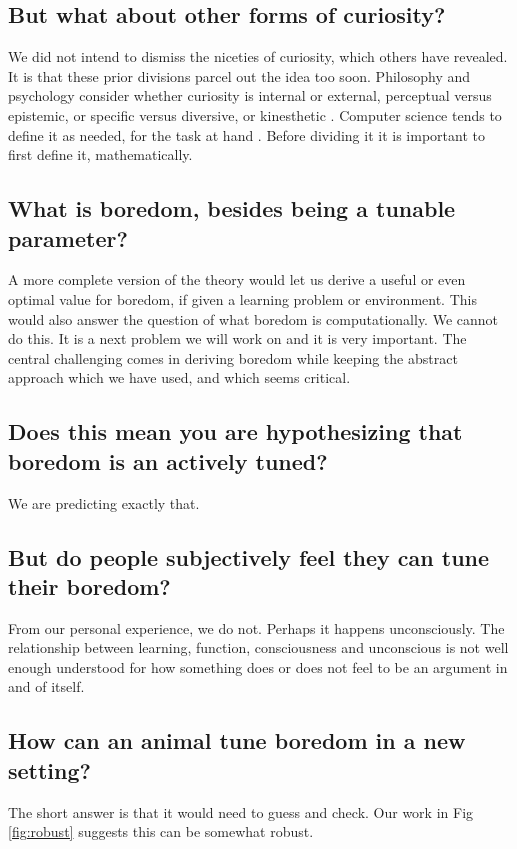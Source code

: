 \subsection*{But what about other forms of curiosity?}
We did not intend to dismiss the niceties of curiosity, which others have revealed. It is that these prior divisions parcel out the idea too soon. Philosophy and psychology consider whether curiosity is internal or external, perceptual versus epistemic, or specific versus diversive, or kinesthetic \cite{Kidd2015,Berlyne1950,Zhou2020}. Computer science tends to define it as needed, for the task at hand \cite{Stanley2004,Friston2016,Lehman2011a,Lehman2013,Mouret2015,Colas2020}. Before dividing it it is important to first define it, mathematically. 


\subsection*{What is boredom, besides being a tunable parameter?}
A more complete version of the theory would let us derive a useful or even optimal value for boredom, if given a learning problem or environment. This would also answer the question of what boredom is computationally. We cannot do this. It is a next problem we will work on and it is very important. The central challenging comes in deriving boredom while keeping the abstract approach which we have used, and which seems critical.


\subsection*{Does this mean you are hypothesizing that boredom is an actively tuned?}
We are predicting exactly that.


\subsection*{But do people subjectively feel they can tune their boredom?}
From our personal experience, we do not. Perhaps it happens unconsciously. The relationship between learning, function, consciousness and unconscious is not well enough understood for how something does or does not feel to be an argument in and of itself.


\subsection*{How can an animal tune boredom in a new setting?}
The short answer is that it would need to guess and check. Our work in Fig \ref{fig:robust} suggests this can be somewhat robust.


